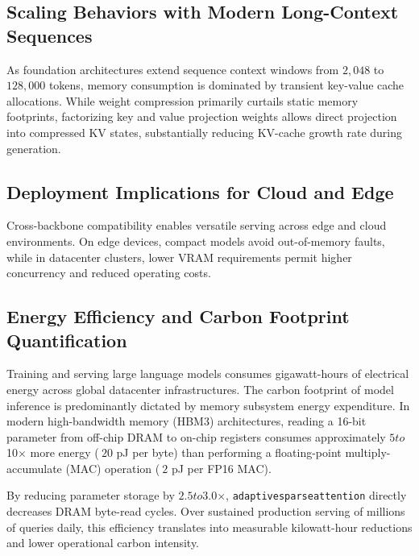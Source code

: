 \subsection{Scaling Behaviors with Modern Long-Context Sequences}
As foundation architectures extend sequence context windows from $2{,}048$ to $128{,}000$ tokens, memory consumption is dominated by transient key-value cache allocations. While weight compression primarily curtails static memory footprints, factorizing key and value projection weights allows direct projection into compressed KV states, substantially reducing KV-cache growth rate during generation.

\subsection{Deployment Implications for Cloud and Edge}
Cross-backbone compatibility enables versatile serving across edge and cloud environments. On edge devices, compact models avoid out-of-memory faults, while in datacenter clusters, lower VRAM requirements permit higher concurrency and reduced operating costs.

\subsection{Energy Efficiency and Carbon Footprint Quantification}
Training and serving large language models consumes gigawatt-hours of electrical energy across global datacenter infrastructures. The carbon footprint of model inference is predominantly dictated by memory subsystem energy expenditure. In modern high-bandwidth memory (HBM3) architectures, reading a 16-bit parameter from off-chip DRAM to on-chip registers consumes approximately $5$\times$ to $10$\times$ more energy ($~20$ pJ per byte) than performing a floating-point multiply-accumulate (MAC) operation ($~2$ pJ per FP16 MAC).

By reducing parameter storage by $2.5$\times$ to $3.0$\times$, \texttt{adaptivesparseattention} directly decreases DRAM byte-read cycles. Over sustained production serving of millions of queries daily, this efficiency translates into measurable kilowatt-hour reductions and lower operational carbon intensity.
